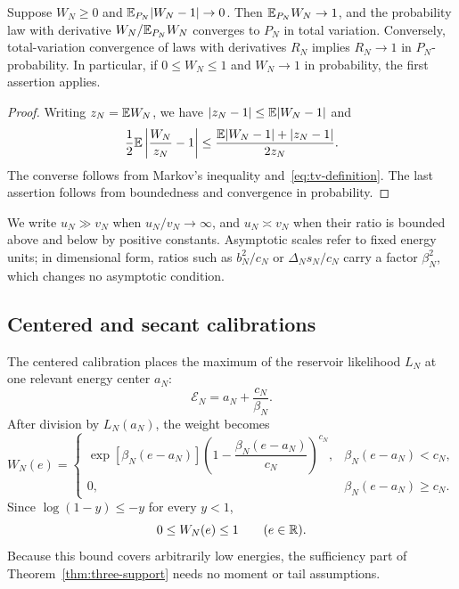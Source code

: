 \begin{lemma}
\label{lem:normalization}
Suppose $W_N\ge0$ and $\mathbb E_{P_N}|W_N-1|\to0$. Then
$\mathbb E_{P_N}W_N\to1$, and the probability law with derivative
$W_N/\mathbb E_{P_N}W_N$ converges to $P_N$ in total variation. Conversely,
total-variation convergence of laws with derivatives $R_N$ implies
$R_N\to1$ in $P_N$-probability. In particular, if $0\le W_N\le1$
and $W_N\to1$ in probability, the first assertion applies.
\end{lemma}
\begin{proof}
Writing $z_N=\mathbb E W_N$, we have $|z_N-1|\le\mathbb E|W_N-1|$ and
\[
 \frac12\mathbb E\left|\frac{W_N}{z_N}-1\right|
 \le\frac{\mathbb E|W_N-1|+|z_N-1|}{2z_N}.
\]
The converse follows from Markov's inequality and~\eqref{eq:tv-definition}.
The last assertion follows from boundedness and convergence in probability.
\end{proof}

We write $u_N\gg v_N$ when $u_N/v_N\to\infty$, and $u_N\asymp v_N$
when their ratio is bounded above and below by positive constants.
Asymptotic scales refer to fixed energy units; in dimensional form,
ratios such as $b_N^2/c_N$ or $\Delta_Ns_N/c_N$ carry a factor
$\beta_N^2$, which changes no asymptotic condition.

\subsection{Centered and secant calibrations}

The centered calibration places the maximum of the reservoir
likelihood $L_N$ at one relevant energy center $a_N$:
\begin{equation}
 \mathcal E_N=a_N+\frac{c_N}{\beta_N}.
 \label{eq:centered-calibration}
\end{equation}
After division by $L_N(a_N)$, the weight becomes
\begin{equation}
 W_N(e)=
 \begin{cases}
 \exp[\beta_N(e-a_N)]
 \left(1-\dfrac{\beta_N(e-a_N)}{c_N}\right)^{c_N},
 &\beta_N(e-a_N)<c_N,\\
 0,&\beta_N(e-a_N)\ge c_N.
 \end{cases}
 \label{eq:centered-weight}
\end{equation}
Since $\log(1-y)\le-y$ for every $y<1$,
\begin{equation}
 0\le W_N(e)\le1\qquad(e\in\mathbb R).
 \label{eq:global-centered-bound}
\end{equation}
Because this bound covers arbitrarily low energies, the sufficiency
part of Theorem~\ref{thm:three-support} needs no moment or tail
assumptions.

